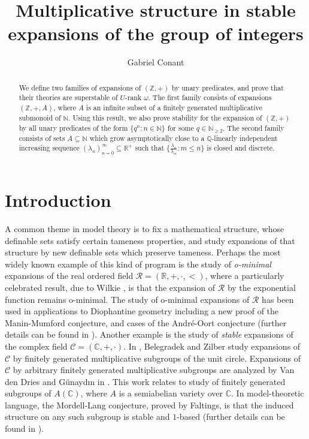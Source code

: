 \documentclass{amsart}
\title[Multiplicative structure in stable expansions of $(\Z,+,0)$]{Multiplicative structure in stable expansions of the group of integers}
\author{Gabriel Conant}
\def\seq{\subseteq}
\newcommand{\cC}{\mathcal{C}}
\newcommand{\cR}{\mathcal{R}}
\def\C{\mathbb C}
\def\N{\mathbb N}
\def\Q{\mathbb Q}
\def\R{\mathbb R}
\def\Z{\mathbb Z}
\theoremstyle{definition}
\begin{document}
\begin{abstract}
We define two families of expansions of $(\Z,+)$ by unary predicates, and prove that their theories are superstable of $U$-rank $\omega$. The first family consists of expansions $(\Z,+,A)$, where $A$ is an infinite subset of a finitely generated multiplicative submonoid of $\N$. Using this result, we also prove stability for the expansion of $(\Z,+)$ by all unary predicates of the form $\{q^n:n\in\N\}$ for some $q\in\N_{\geq 2}$. The second family consists of sets $A\seq\N$ which grow asymptotically close to a $\Q$-linearly independent increasing sequence $(\lambda_n)_{n=0}^\infty\seq\R^+$ such that $\{\frac{\lambda_n}{\lambda_m}:m\leq n\}$ is closed and discrete.
\end{abstract}


\maketitle


\section{Introduction}\label{sec:intro}
\setcounter{theorem}{0}

A common theme in model theory is to fix a mathematical structure, whose definable sets satisfy certain tameness properties, and study expansions of that structure by new definable sets which preserve tameness. Perhaps the most widely known example of this kind of program is the study of \emph{o-minimal} expansions of the real ordered field $\cR=(\R,+,\cdot,<)$, where a particularly celebrated result, due to Wilkie \cite{Wilkie}, is that the expansion of $\cR$ by the exponential function remains o-minimal.  The study of o-minimal expansions of $\cR$ has been used in applications to Diophantine geometry including a new proof of the Manin-Mumford conjecture, and cases of the Andr\'{e}-Oort conjecture (further details can be found in \cite{ScanAO}). Another example is the study of \emph{stable} expansions of the complex field $\cC=(\C,+,\cdot)$. In \cite{BeZi}, Belegradek and Zilber study expansions of $\cC$ by finitely generated multiplicative subgroups of the unit circle. Expansions of $\cC$ by arbitrary finitely generated multiplicative subgroups are analyzed by Van den Dries and G\"{u}nayd{\i}n in \cite{vdDGu}. This work relates to study of finitely generated subgroups of $A(\C)$, where $A$ is a semiabelian variety over $\C$. In model-theoretic language, the  Mordell-Lang conjecture, proved by Faltings, is that the induced structure on any such subgroup is stable and $1$-based (further details can be found in \cite{PiLC}).
\end{document}
